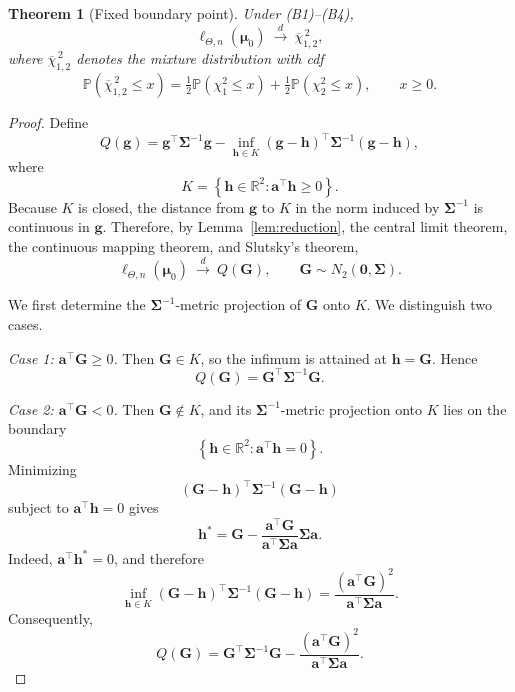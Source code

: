 \documentclass[11pt]{article}
\newtheorem{theorem}{Theorem}[section]
\theoremstyle{remark}
\newcommand{\Pp}{\mathbb{P}}
\newcommand{\barchi}[2]{\overline{\chi}^{\,2}_{#1,#2}}
\begin{document}
\begin{theorem}[Fixed boundary point]\label{thm:fixed-boundary}
Under (B1)--(B4),
$$
  \ell_{\Theta,n}(\boldsymbol{\mu}_0)
  \ \xrightarrow{d}\
  \barchi{1}{2},
$$
where $\barchi{1}{2}$ denotes the mixture distribution with cdf
$$
  \Pp(\barchi{1}{2}\leq x)
  =
  \tfrac12\Pp(\chi^2_1\leq x)
  +
  \tfrac12\Pp(\chi^2_2\leq x),
  \qquad x\geq0.
$$
\end{theorem}


\begin{proof}

Define
$$
Q(\boldsymbol{g})
=
\boldsymbol{g}^{\top}\boldsymbol{\Sigma}^{-1}\boldsymbol{g}
-
\inf_{\boldsymbol{h}\in K}
(\boldsymbol{g}-\boldsymbol{h})^{\top}
\boldsymbol{\Sigma}^{-1}
(\boldsymbol{g}-\boldsymbol{h}),
$$
where
$$
K
=
\left\{
\boldsymbol{h}\in\mathbb{R}^{2}:
\boldsymbol{a}^{\top}\boldsymbol{h}\geq 0
\right\}.
$$
Because $K$ is closed, the distance from $\boldsymbol{g}$ to $K$ in the norm induced by $\boldsymbol{\Sigma}^{-1}$ is continuous in $\boldsymbol{g}$. Therefore, by Lemma~\ref{lem:reduction}, the central limit theorem, the continuous mapping theorem, and Slutsky's theorem,
$$
\ell_{\Theta,n}(\boldsymbol{\mu}_0)
\ \xrightarrow{d}\
Q(\boldsymbol{G}),
\qquad
\boldsymbol{G}\sim
N_2(\boldsymbol{0},\boldsymbol{\Sigma}).
$$

We first determine the $\boldsymbol{\Sigma}^{-1}$-metric projection of $\boldsymbol{G}$ onto $K$. We distinguish two cases.

\medskip
\noindent\emph{Case 1: $\boldsymbol{a}^{\top}\boldsymbol{G}\geq 0$.}
Then $\boldsymbol{G}\in K$, so the infimum is attained at $\boldsymbol{h}=\boldsymbol{G}$. Hence
$$
Q(\boldsymbol{G})
=
\boldsymbol{G}^{\top}
\boldsymbol{\Sigma}^{-1}
\boldsymbol{G}.
$$

\medskip
\noindent\emph{Case 2: $\boldsymbol{a}^{\top}\boldsymbol{G}<0$.}
Then $\boldsymbol{G}\notin K$, and its $\boldsymbol{\Sigma}^{-1}$-metric projection onto $K$ lies on the boundary
$$
\left\{
\boldsymbol{h}\in\mathbb{R}^{2}:
\boldsymbol{a}^{\top}\boldsymbol{h}=0
\right\}.
$$
Minimizing
$$
(\boldsymbol{G}-\boldsymbol{h})^{\top}
\boldsymbol{\Sigma}^{-1}
(\boldsymbol{G}-\boldsymbol{h})
$$
subject to $\boldsymbol{a}^{\top}\boldsymbol{h}=0$ gives
$$
\boldsymbol{h}^{*}
=
\boldsymbol{G}
-
\frac{\boldsymbol{a}^{\top}\boldsymbol{G}}
     {\boldsymbol{a}^{\top}\boldsymbol{\Sigma}\boldsymbol{a}}
\boldsymbol{\Sigma}\boldsymbol{a}.
$$
Indeed, $\boldsymbol{a}^{\top}\boldsymbol{h}^{*}=0$, and therefore
$$
\inf_{\boldsymbol{h}\in K}
(\boldsymbol{G}-\boldsymbol{h})^{\top}
\boldsymbol{\Sigma}^{-1}
(\boldsymbol{G}-\boldsymbol{h})
=
\frac{
(\boldsymbol{a}^{\top}\boldsymbol{G})^{2}
}{
\boldsymbol{a}^{\top}\boldsymbol{\Sigma}\boldsymbol{a}
}.
$$
Consequently,
$$
Q(\boldsymbol{G})
=
\boldsymbol{G}^{\top}
\boldsymbol{\Sigma}^{-1}
\boldsymbol{G}
-
\frac{
(\boldsymbol{a}^{\top}\boldsymbol{G})^{2}
}{
\boldsymbol{a}^{\top}\boldsymbol{\Sigma}\boldsymbol{a}
}.
$$


\end{proof}
\end{document}
